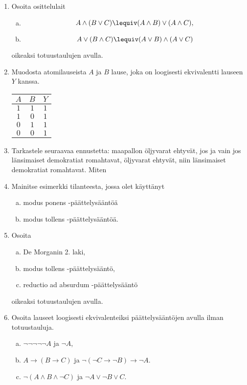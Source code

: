 \begin{kotitehtavasivu}
\begin{enumerate}
\item Osoita osittelulait
\begin{enumerate}[a)]
\item
\[
A \land (B \lor C) \lequiv (A \land B) \lor (A\land C),
\]
\item
\[
A \lor (B \land C) \lequiv (A \lor B) \land (A\lor C)
\]
\end{enumerate}
oikeaksi totuustaulujen avulla.

\item Muodosta atomilauseista $A$ ja $B$ lause, joka on
loogisesti ekvivalentti lauseen $Y$ kanssa.
\begin{center}
\begin{tabular}{|c|c|c|}\hline
$A$ & $B$ & $Y$\\ \hline
$1$ & $1$ & $1$\\
$1$ & $0$ & $1$\\
$0$ & $1$ & $1$\\

$0$ & $0$ & $1$\\ \hline
\end{tabular}
\end{center}

\item Tarkastele seuraavaa ennustetta: maapallon öljyvarat ehtyvät, jos ja vain jos länsimaiset demokratiat romahtavat, %
öljyvarat ehtyvät, niin länsimaiset demokratiat romahtavat. Miten %

\item Mainitse esimerkki tilanteesta, jossa olet käyttänyt
\begin{enumerate}[a)]
\item modus ponens -päättelysääntöä
\item modus tollens -päättelysääntöä.
\end{enumerate}

\item Osoita
\begin{enumerate}[a)]
\item De Morganin 2. laki,
\item modus tollens -päättelysääntö,
\item reductio ad absurdum -päättelysääntö
\end{enumerate}
oikeaksi totuustaulujen avulla.

\item Osoita lauseet loogisesti ekvivalenteiksi
päättelysääntöjen avulla ilman totuustauluja.
\begin{enumerate}[a)]
\item $\lnot \lnot \lnot \lnot \lnot A$ ja $\lnot A$,
\item $A \to (B \to C)$ ja $\lnot (\lnot C \to \lnot
B) \to \lnot A$.
\item $\lnot (A \land B \land \lnot C)$ ja $\lnot A
\lor \lnot B \lor C$.
\end{enumerate}


\end{enumerate}
\end{kotitehtavasivu}

